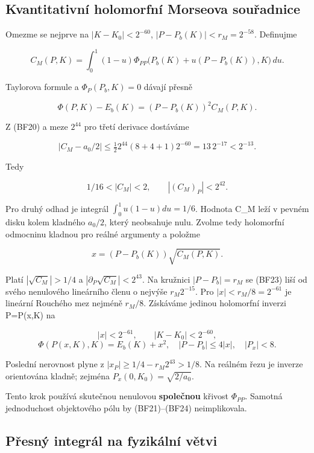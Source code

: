 \documentclass[11pt,a4paper]{article}
\theoremstyle{remark}\newtheorem{remark}[theorem]{Poznámka}
\numberwithin{equation}{section}
\begin{document}
\hypertarget{kvantitativnuxed-holomorfnuxed-morseova-souux159adnice}{%
\subsection{Kvantitativní holomorfní Morseova
souřadnice}\label{kvantitativnuxed-holomorfnuxed-morseova-souux159adnice}}

Omezme se nejprve na \(|K-K_0|<2^{-60}\), \(|P-P_b(K)|<r_M=2^{-58}\).
Definujme

\[
C_M(P,K)=\int_0^1(1-u)
\Phi_{PP}\bigl(P_b(K)+u(P-P_b(K)),K\bigr)\,du.
\]

Taylorova formule a \(\Phi_P(P_b,K)=0\) dávají přesně

\[
\Phi(P,K)-E_b(K)=(P-P_b(K))^2 C_M(P,K).
\tag{BF21}
\]

Z (BF20) a meze \(2^{44}\) pro třetí derivace dostáváme

\[
|C_M-a_0/2|
\le\tfrac12 2^{44}(8+4+1)2^{-60}
=13\,2^{-17}<2^{-13}.
\]

Tedy

\[
1/16<|C_M|<2,\qquad |(C_M)_P|<2^{42}.
\tag{BF22}
\]

Pro druhý odhad je integrál \(\int_0^1u(1-u)du=1/6\). Hodnota C\_M leží
v pevném disku kolem kladného \(a_0/2\), který neobsahuje nulu. Zvolme
tedy holomorfní odmocninu kladnou pro reálné argumenty a položme

\[
x=(P-P_b(K))\sqrt{C_M(P,K)}.
\tag{BF23}
\]

Platí \(|\sqrt{C_M}|>1/4\) a \(|\partial_P\sqrt{C_M}|<2^{43}\). Na
kružnici \(|P-P_b|=r_M\) se (BF23) liší od svého nenulového lineárního
členu o nejvýše \(r_M2^{-15}\). Pro \(|x|<r_M/8=2^{-61}\) je lineární
Rouchého mez nejméně \(r_M/8\). Získáváme jedinou holomorfní inverzi
P=P(x,K) na

\[
|x|<2^{-61},\qquad |K-K_0|<2^{-60},
\] \[
\boxed{
\Phi(P(x,K),K)=E_b(K)+x^2,\quad
|P-P_b|\le4|x|,\quad |P_x|<8.}
\tag{BF24}
\]

Poslední nerovnost plyne z \(|x_P|\ge1/4-r_M2^{43}>1/8\). Na reálném
řezu je inverze orientována kladně; zejména \(P_x(0,K_0)=\sqrt{2/a_0}\).

Tento krok používá skutečnou nenulovou \textbf{společnou} křivost
\(\Phi_{PP}\). Samotná jednoduchost objektového pólu by (BF21)--(BF24)
neimplikovala.

\hypertarget{pux159esnuxfd-integruxe1l-na-fyzikuxe1lnuxed-vux11btvi}{%
\subsection{Přesný integrál na fyzikální
větvi}\label{pux159esnuxfd-integruxe1l-na-fyzikuxe1lnuxed-vux11btvi}}
\end{document}
